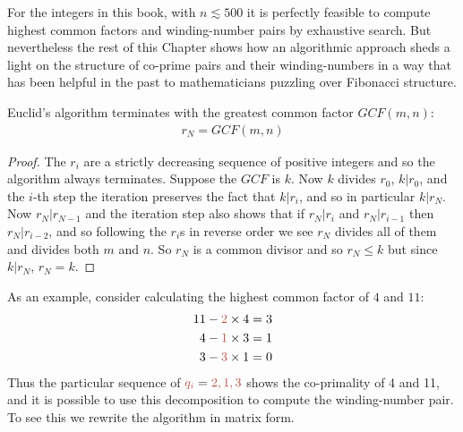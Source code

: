 For the integers in this book, with $n\lesssim 500$ it is perfectly feasible to compute highest common factors and winding-number pairs by exhaustive search. But nevertheless the rest of this Chapter shows how an algorithmic approach sheds a light on the structure of co-prime pairs and their winding-numbers in a way that has been helpful in the past to mathematicians puzzling over Fibonacci structure. 

\begin{theorem}
	Euclid's algorithm terminates with the greatest common factor $GCF(m,n)$:
	\begin{eqnarray}
		r_N =  
		GCF(m,n) 
	\end{eqnarray}
\end{theorem}
\begin{proof}
	The $r_i$ are a strictly decreasing sequence of positive integers and so the algorithm always terminates. Suppose the $GCF$ is $k$. Now $k$ divides $r_0$, $k|r_0$, and the $i$-th step the iteration preserves the fact that  $k|r_i$,  and so in particular $k|r_N$. Now $r_N|r_{N-1}$ and the iteration step also shows that if $r_N|r_i$ and $r_N|r_{i-1}$ then $r_N|r_{i-2}$, and so following the $r_i$s in reverse order we see $r_N$ divides all of them and divides both $m$ and $n$.  So $r_N$ is a common divisor and so $r_N\leq k$ but since $k|r_N$, $r_N=k$. 
\end{proof}
As an example, consider calculating the highest common factor of $4$ and $11$:
\begin{align}
	11 - {\jHeadingColour 2}\times 4 & = 3 
	\\
	4 - {\jHeadingColour 1}\times 3 & = 1\label{eq:411}
	\\
	3 - {\jHeadingColour 3}\times 1 & = 0 
\end{align}
Thus the particular sequence of $\jqi={\jHeadingColour 2, 1, 3}$ shows the co-primality of 4 and 11, and it is possible to use this decomposition to compute the winding-number pair. To see this we rewrite the algorithm in matrix form. 

